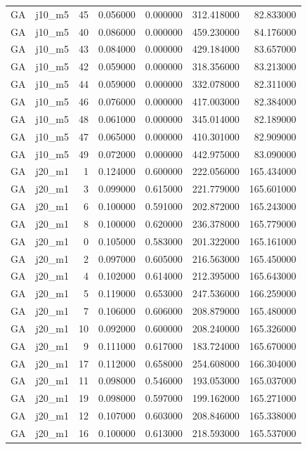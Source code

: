 \begin{tabular}{llrrrrr}
GA & j10_m5 & 45 & 0.056000 & 0.000000 & 312.418000 & 82.833000 \\
GA & j10_m5 & 40 & 0.086000 & 0.000000 & 459.230000 & 84.176000 \\
GA & j10_m5 & 43 & 0.084000 & 0.000000 & 429.184000 & 83.657000 \\
GA & j10_m5 & 42 & 0.059000 & 0.000000 & 318.356000 & 83.213000 \\
GA & j10_m5 & 44 & 0.059000 & 0.000000 & 332.078000 & 82.311000 \\
GA & j10_m5 & 46 & 0.076000 & 0.000000 & 417.003000 & 82.384000 \\
GA & j10_m5 & 48 & 0.061000 & 0.000000 & 345.014000 & 82.189000 \\
GA & j10_m5 & 47 & 0.065000 & 0.000000 & 410.301000 & 82.909000 \\
GA & j10_m5 & 49 & 0.072000 & 0.000000 & 442.975000 & 83.090000 \\
GA & j20_m1 & 1 & 0.124000 & 0.600000 & 222.056000 & 165.434000 \\
GA & j20_m1 & 3 & 0.099000 & 0.615000 & 221.779000 & 165.601000 \\
GA & j20_m1 & 6 & 0.100000 & 0.591000 & 202.872000 & 165.243000 \\
GA & j20_m1 & 8 & 0.100000 & 0.620000 & 236.378000 & 165.779000 \\
GA & j20_m1 & 0 & 0.105000 & 0.583000 & 201.322000 & 165.161000 \\
GA & j20_m1 & 2 & 0.097000 & 0.605000 & 216.563000 & 165.450000 \\
GA & j20_m1 & 4 & 0.102000 & 0.614000 & 212.395000 & 165.643000 \\
GA & j20_m1 & 5 & 0.119000 & 0.653000 & 247.536000 & 166.259000 \\
GA & j20_m1 & 7 & 0.106000 & 0.606000 & 208.879000 & 165.480000 \\
GA & j20_m1 & 10 & 0.092000 & 0.600000 & 208.240000 & 165.326000 \\
GA & j20_m1 & 9 & 0.111000 & 0.617000 & 183.724000 & 165.670000 \\
GA & j20_m1 & 17 & 0.112000 & 0.658000 & 254.608000 & 166.304000 \\
GA & j20_m1 & 11 & 0.098000 & 0.546000 & 193.053000 & 165.037000 \\
GA & j20_m1 & 19 & 0.098000 & 0.597000 & 199.162000 & 165.271000 \\
GA & j20_m1 & 12 & 0.107000 & 0.603000 & 208.846000 & 165.338000 \\
GA & j20_m1 & 16 & 0.100000 & 0.613000 & 218.593000 & 165.537000 \\

\end{tabular}
